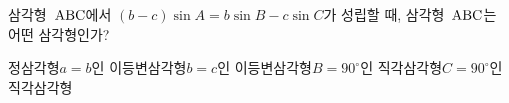 삼각형~$\mathrm{ABC}$에서 $(b-c)\sin A=b\sin B-c\sin C$가 성립할 때, 삼각형~$\mathrm{ABC}$는 어떤 삼각형인가?
\begin{choicesii}{정삼각형}{$a=b$인 이등변삼각형}{$b=c$인 이등변삼각형}{$B=90^\circ$인 직각삼각형}{$C=90^\circ$인 직각삼각형}\end{choicesii}
